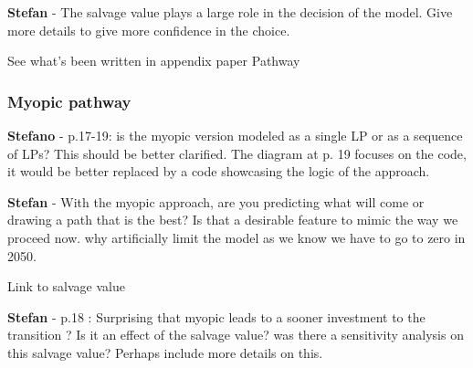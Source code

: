 \documentclass[12pt,a4paper]{article}
\begin{document}
\begin{mdframed}[style=comment] %
{\color{teal} \textbf{Stefan}} - The salvage value plays a large role in the decision of the model. Give more details to give more confidence in the choice.
\end{mdframed}

\noindent See what's been written in appendix paper Pathway

\begin{mdframed}[style=manuscript] %

\end{mdframed}

\subsubsection{Myopic pathway}

\begin{mdframed}[style=comment] %
{\color{orange} \textbf{Stefano}} - p.17-19: is the myopic version modeled as a single LP or as a sequence of LPs? This should be better clarified. The diagram at p. 19 focuses on the code, it would be better replaced by a code showcasing the logic of the approach.
\end{mdframed}

\noindent 

\begin{mdframed}[style=manuscript] %

\end{mdframed}

\begin{mdframed}[style=comment] %
{\color{teal} \textbf{Stefan}} - With the myopic approach, are you predicting what will come or drawing a path that is the best? Is that a desirable feature to mimic the way we proceed now. why artificially limit the model as we know we have to go to zero in 2050.
\end{mdframed}

\noindent Link to salvage value

\begin{mdframed}[style=manuscript] %

\end{mdframed}

\begin{mdframed}[style=comment] %
{\color{teal} \textbf{Stefan}} - p.18 : Surprising that myopic leads to a sooner investment to the transition ? Is it an effect of the salvage value? was there a sensitivity analysis on this salvage value? Perhaps include more details on this.
\end{mdframed}
\end{document}
